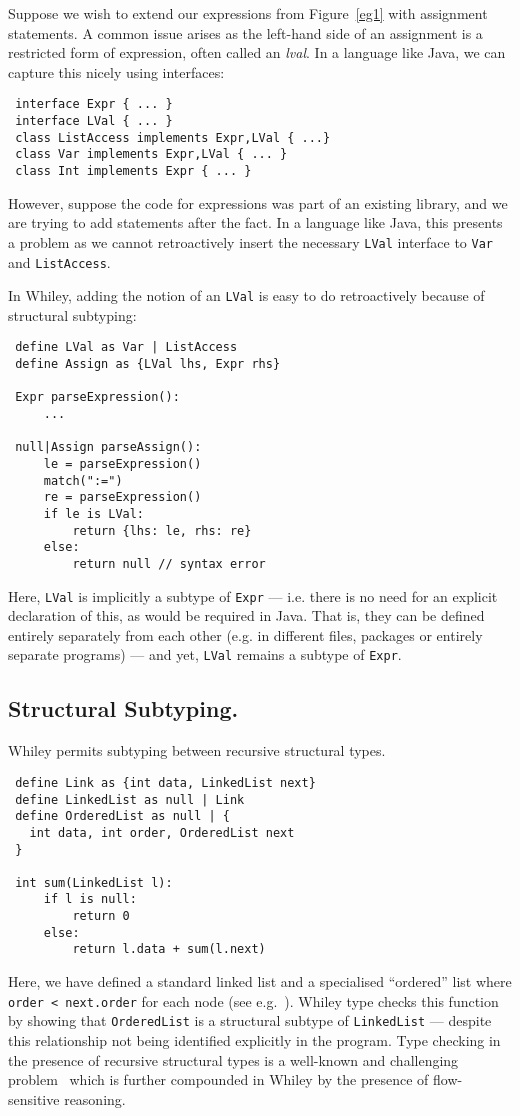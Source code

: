 Suppose we wish to extend our expressions from Figure~\ref{eg1} with
assignment statements.  A common issue arises as the left-hand side of
an assignment is a restricted form of expression, often called an {\em
  lval}.  In a language like Java, we can capture this nicely using
interfaces:
\begin{lstlisting}
 interface Expr { ... }
 interface LVal { ... }
 class ListAccess implements Expr,LVal { ...}
 class Var implements Expr,LVal { ... }
 class Int implements Expr { ... }
\end{lstlisting}
However, suppose the code for expressions was part of an existing
library, and we are trying to add statements after the fact.  In a
language like Java, this presents a problem as we cannot
retroactively insert the necessary \lstinline{LVal} interface to
\lstinline{Var} and \lstinline{ListAccess}.

In Whiley, adding the notion of an \lstinline{LVal} is easy to do
retroactively because of structural subtyping:

\begin{lstlisting}
 define LVal as Var | ListAccess 
 define Assign as {LVal lhs, Expr rhs}
 
 Expr parseExpression():
     ...

 null|Assign parseAssign():
     le = parseExpression()
     match(":=")
     re = parseExpression()
     if le is LVal:
         return {lhs: le, rhs: re}
     else:
         return null // syntax error
\end{lstlisting}
Here, \lstinline{LVal} is implicitly a subtype of \lstinline{Expr} ---
i.e. there is no need for an explicit declaration of this, as would be
required in Java.  That is, they can be defined entirely separately
from each other (e.g. in different files, packages or entirely
separate programs) --- and yet, \lstinline{LVal} remains a subtype of
\lstinline{Expr}.

\subsection{Structural Subtyping.}
Whiley permits subtyping between recursive structural types.
\begin{lstlisting}
 define Link as {int data, LinkedList next}
 define LinkedList as null | Link
 define OrderedList as null | {
   int data, int order, OrderedList next
 }

 int sum(LinkedList l):
     if l is null:
         return 0
     else:
         return l.data + sum(l.next)
\end{lstlisting}
Here, we have defined a standard linked list and a specialised
``ordered'' list where \lstinline{order < next.order} for each node
(see e.g.~\cite{DS87}).  Whiley type checks this function by showing
that \lstinline{OrderedList} is a structural subtype of
\lstinline{LinkedList} --- despite this relationship not being
identified explicitly in the program.  Type checking in the presence
of recursive structural types is a well-known and challenging
problem~\cite{GLP02,CA93,KPS93} which is further compounded in Whiley
by the presence of flow-sensitive reasoning.

